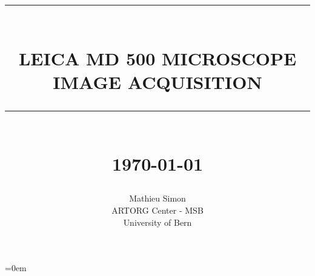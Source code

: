 




\parindent=0em
\pagestyle{fancy}

\renewcommand{\headrulewidth}{0pt}
\newcommand{\HRule}[1]{\rule{\linewidth}{#1}}



\fancyhead[L]{}   %
\fancyhead[R]{}   %




{\selectfont
\title{
\textsc{}
\\ [2.0cm] 
\HRule{0.5pt} \\  \vspace{0.5cm}
\LARGE
\uppercase{Leica MD 500 Microscope \\ \vspace{1cm}
\normalsize Image Acquisition} \\ \vspace{0.5cm}
\HRule{2pt}
\\ [2.5cm]
\normalsize\today
\vspace*{5\baselineskip}}
}

\date{}



{\selectfont
\author{
Mathieu Simon \\ 
ARTORG Center - MSB \\
University of Bern}}